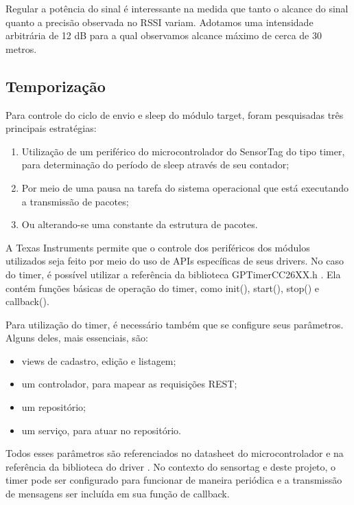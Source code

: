 Regular a potência do sinal é interessante na medida que tanto o alcance do sinal quanto a precisão observada no RSSI variam. Adotamos uma intensidade arbitrária de 12 dB para a qual observamos alcance máximo de cerca de 30 metros.

\subsection{Temporização}

Para controle do ciclo de envio e sleep do módulo target, foram pesquisadas três principais estratégias:

\begin{enumerate}
  \item Utilização de um periférico do microcontrolador do SensorTag do tipo timer, para determinação do período de sleep através de seu contador;
  \item Por meio de uma pausa na tarefa do sistema operacional que está executando a transmissão de pacotes;
  \item Ou alterando-se uma constante da estrutura de pacotes.
\end{enumerate}

A Texas Instruments permite que o controle dos periféricos dos módulos utilizados seja feito por meio do uso de APIs específicas de seus drivers. No caso do timer, é possível utilizar a referência da biblioteca GPTimerCC26XX.h \cite{gptimer}. Ela contém funções básicas de operação do timer, como init(), start(), stop() e callback().

Para utilização do timer, é necessário também que se configure seus parâmetros. Alguns deles, mais essenciais, são:

\begin{itemize}
	\item views de cadastro, edição e listagem;
	\item um controlador, para mapear as requisições REST;
	\item um repositório;
	\item um serviço, para atuar no repositório.
\end{itemize}

Todos esses parâmetros são referenciados no datasheet do microcontrolador \cite{st-datasheet} e na referência da biblioteca do driver \cite{gptimer}. No contexto do sensortag e deste projeto, o timer pode ser configurado para funcionar de maneira periódica e a transmissão de mensagens ser incluída em sua função de callback.

